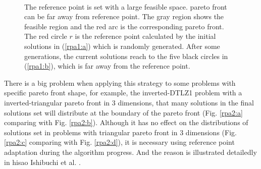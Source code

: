\documentclass[conference]{IEEEtran}
\begin{document}
\begin{figure}[!t]
  \centering
  \quad
  \\
  \caption{The reference point is set with a large feasible space.
  pareto front can be far away from reference point.
  The gray region shows the feasible region and the red arc is the corresponding pareto front.
  The red circle $r$ is the reference point calculated by the initial solutions in (\ref{rpa1:a})
  which is randomly generated.
  After some generations, the current solutions reach to the five black circles in (\ref{rpa1:b}), 
  which is far away from the reference point.}
  \label{rpa1}
\end{figure}

There is a big problem when applying this strategy to some problems with specific pareto front shape, 
for example, the inverted-DTLZ1 problem with a inverted-triangular pareto front in 3 dimensions,
that many solutions in the final solutions set will distribute at the boundary of the pareto front
(Fig. \ref{rpa2:a} comparing with Fig. \ref{rpa2:b})\cite{hisao1,hisao2}. 
Although it has no effect on the distributions of solutions set 
in problems with triangular pareto front in 3 dimensions 
(Fig. \ref{rpa2:c} comparing with Fig. \ref{rpa2:d}), 
it is necessary using reference point adaptation during the algorithm progress.
And the reason is illustrated detailedly in hisao Ishibuchi et al. \cite{hisaos}. %
\end{document}
